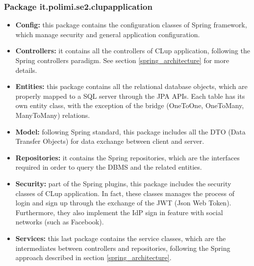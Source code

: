 \documentclass[table, 12pt]{article}
\begin{document}
\subsubsection*{Package it.polimi.se2.clupapplication}
\begin{itemize}
    \item \textbf{Config:} this package contains the configuration classes of Spring framework, which manage security and general application configuration.
    \item \textbf{Controllers:} it contains all the controllers of CLup application, following the Spring controllers paradigm. See section \ref{spring_architecture} for more details.
    \item \textbf{Entities:} this package contains all the relational database objects, which are properly mapped to a SQL server through the JPA APIs. Each table has its own entity class, with the exception of the bridge (OneToOne, OneToMany, ManyToMany) relations.
    \item \textbf{Model:} following Spring standard, this package includes all the DTO (Data Transfer Objects) for data exchange between client and server.
    \item \textbf{Repositories:} it contains the Spring repositories, which are the interfaces required in order to query the DBMS and the related entities.
    \item \textbf{Security:} part of the Spring plugins, this package includes the security classes of CLup application. In fact, these classes manages the process of login and sign up through the exchange of the JWT (Json Web Token). Furthermore, they also implement the IdP sign in feature with social networks (such as Facebook).
    \item \textbf{Services:} this last package contains the service classes, which are the intermediates between controllers and repositories, following the Spring approach described in section \ref{spring_architecture}.
\end{itemize}
\end{document}

